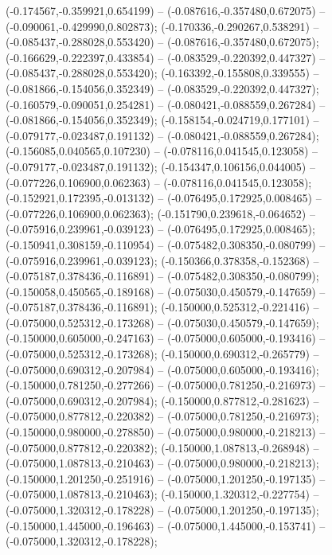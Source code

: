  (-0.174567,-0.359921,0.654199) -- (-0.087616,-0.357480,0.672075) -- (-0.090061,-0.429990,0.802873);
 (-0.170336,-0.290267,0.538291) -- (-0.085437,-0.288028,0.553420) -- (-0.087616,-0.357480,0.672075);
 (-0.166629,-0.222397,0.433854) -- (-0.083529,-0.220392,0.447327) -- (-0.085437,-0.288028,0.553420);
 (-0.163392,-0.155808,0.339555) -- (-0.081866,-0.154056,0.352349) -- (-0.083529,-0.220392,0.447327);
 (-0.160579,-0.090051,0.254281) -- (-0.080421,-0.088559,0.267284) -- (-0.081866,-0.154056,0.352349);
 (-0.158154,-0.024719,0.177101) -- (-0.079177,-0.023487,0.191132) -- (-0.080421,-0.088559,0.267284);
 (-0.156085,0.040565,0.107230) -- (-0.078116,0.041545,0.123058) -- (-0.079177,-0.023487,0.191132);
 (-0.154347,0.106156,0.044005) -- (-0.077226,0.106900,0.062363) -- (-0.078116,0.041545,0.123058);
 (-0.152921,0.172395,-0.013132) -- (-0.076495,0.172925,0.008465) -- (-0.077226,0.106900,0.062363);
 (-0.151790,0.239618,-0.064652) -- (-0.075916,0.239961,-0.039123) -- (-0.076495,0.172925,0.008465);
 (-0.150941,0.308159,-0.110954) -- (-0.075482,0.308350,-0.080799) -- (-0.075916,0.239961,-0.039123);
 (-0.150366,0.378358,-0.152368) -- (-0.075187,0.378436,-0.116891) -- (-0.075482,0.308350,-0.080799);
 (-0.150058,0.450565,-0.189168) -- (-0.075030,0.450579,-0.147659) -- (-0.075187,0.378436,-0.116891);
 (-0.150000,0.525312,-0.221416) -- (-0.075000,0.525312,-0.173268) -- (-0.075030,0.450579,-0.147659);
 (-0.150000,0.605000,-0.247163) -- (-0.075000,0.605000,-0.193416) -- (-0.075000,0.525312,-0.173268);
 (-0.150000,0.690312,-0.265779) -- (-0.075000,0.690312,-0.207984) -- (-0.075000,0.605000,-0.193416);
 (-0.150000,0.781250,-0.277266) -- (-0.075000,0.781250,-0.216973) -- (-0.075000,0.690312,-0.207984);
 (-0.150000,0.877812,-0.281623) -- (-0.075000,0.877812,-0.220382) -- (-0.075000,0.781250,-0.216973);
 (-0.150000,0.980000,-0.278850) -- (-0.075000,0.980000,-0.218213) -- (-0.075000,0.877812,-0.220382);
 (-0.150000,1.087813,-0.268948) -- (-0.075000,1.087813,-0.210463) -- (-0.075000,0.980000,-0.218213);
 (-0.150000,1.201250,-0.251916) -- (-0.075000,1.201250,-0.197135) -- (-0.075000,1.087813,-0.210463);
 (-0.150000,1.320312,-0.227754) -- (-0.075000,1.320312,-0.178228) -- (-0.075000,1.201250,-0.197135);
 (-0.150000,1.445000,-0.196463) -- (-0.075000,1.445000,-0.153741) -- (-0.075000,1.320312,-0.178228);

